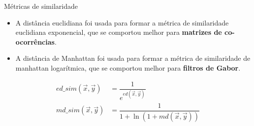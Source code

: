 \documentclass{templatebeamerufc/libs/ufc_format}
\begin{document}
\begin{frame}{Métricas de similaridade}
  \begin{itemize}
  \item A distância euclidiana foi usada
    para formar a métrica de similaridade euclidiana exponencial, que se
    comportou melhor para \textbf{matrizes de co-ocorrências}.
   \item A distância de Manhattan foi usada para formar a métrica de
     similaridade de manhattan logarítmica, que se comportou melhor para
     \textbf{filtros de Gabor}.
  \end{itemize}

  \begin{equation*}\label{eq:similaridades}
    \begin{aligned}
      ed\_sim(\vec{x}, \vec{y}) &= \dfrac{1}{e^{ed(\vec{x}, \vec{y})}} \\
      md\_sim(\vec{x}, \vec{y}) &= \dfrac{1}{1 + \ln(1 + md(\vec{x}, \vec{y}))}
    \end{aligned}
  \end{equation*}

\end{frame}
\end{document}
